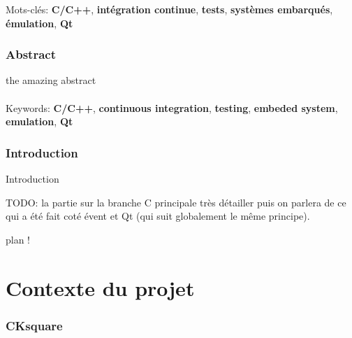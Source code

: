 \documentclass[a4paper]{article}
\begin{document}
\noindent
Mots-clés: \textbf{C/C++}, \textbf{intégration continue}, \textbf{tests},
\textbf{systèmes embarqués}, \textbf{émulation}, \textbf{Qt}

\section*{Abstract}

the amazing abstract
\\~\\

\noindent
Keywords: \textbf{C/C++}, \textbf{continuous integration}, \textbf{testing},
\textbf{embeded system}, \textbf{emulation}, \textbf{Qt}

\clearpage{}

\pagestyle{plain}
\setcounter{page}{1}
\clearpage
\section*{Introduction}

Introduction

TODO: la partie sur la branche C principale très détailler puis on parlera de ce
qui a été fait coté évent et Qt (qui suit globalement le même principe).

plan !

\clearpage{}



\part{Contexte du projet}

\section{CKsquare}%
\end{document}
